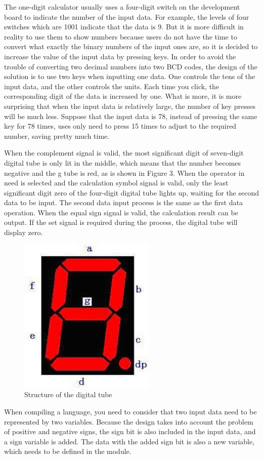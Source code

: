 \documentclass[conference,compsoc]{IEEEtran}
\begin{document}
The one-digit calculator usually uses a four-digit switch on the development board to indicate the number of the input data. For example, the levels of four switches which are 1001 indicate that the data is 9. But it is more difficult in reality to use them to show numbers because users do not have the time to convert what exactly the binary numbers of the input ones are, so it is decided to increase the value of the input data by pressing keys. In order to avoid the trouble of converting two decimal numbers into two BCD codes, the design of the solution is to use two keys when inputting one data. One controls the tens of the input data, and the other controls the units. Each time you click, the corresponding digit of the data is increased by one. What is more, it is more surprising that when the input data is relatively large, the number of key presses will be much less. Suppose that the input data is 78, instead of pressing the same key for 78 times, uses only need to press 15 times to adjust to the required number, saving pretty much time. 

When the complement signal is valid, the most significant digit of seven-digit digital tube is only lit in the middle, which means that the number becomes negative and the g tube is red, as is shown in Figure 3. When the operator in need is selected and the calculation symbol signal is valid, only the least significant digit zero of the four-digit digital tube lights up, waiting for the second data to be input. The second data input process is the same as the first data operation. When the equal sign signal is valid, the calculation result can be output. If the set signal is required during the process, the digital tube will display zero. 
\begin{figure}[H]
	\centering
	\includegraphics[width=6.5cm]{fig4}
	\caption{Structure of the digital tube}
	\label{Fig4}
\end{figure}
When compiling a language, you need to consider that two input data need to be represented by two variables. Because the design takes into account the problem of positive and negative signs, the sign bit is also included in the input data, and a sign variable is added. The data with the added sign bit is also a new variable, which needs to be defined in the module. 
\end{document}
